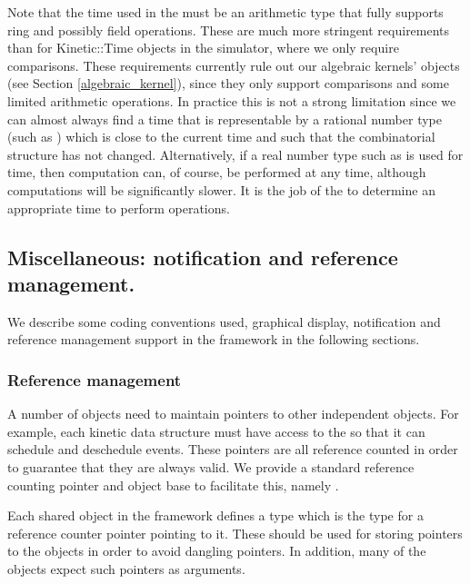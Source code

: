 Note that the time used in the  must
be an arithmetic type that fully supports ring and possibly field
operations.  These are much more stringent requirements than for
Kinetic::Time objects in the simulator, where we only require
comparisons. These requirements currently rule out our algebraic
kernels'  objects (see Section \ref{algebraic_kernel}),
since they only support comparisons and some limited arithmetic
operations. In practice this is not a strong limitation since we can
almost always find a time that is representable by a rational number
type (such as ) which is close to the current time and such
that the combinatorial structure has not changed. Alternatively, if a
real number type such as  is used for time, then
computation can, of course, be performed at any time, although
computations will be significantly slower.  It is the job of the
 to determine an appropriate time to perform
operations.


\subsection{Miscellaneous: notification and reference management.}
\label{sec:misc}

We describe some coding conventions used, graphical display,
notification and reference management support in the framework in the
following sections.


\subsubsection{Reference management}

A number of objects need to maintain pointers to other independent
objects. For example, each kinetic data structure must have access to
the  so that it can schedule and deschedule
events. These pointers are all reference counted in order to guarantee
that they are always valid. We provide a standard reference counting
pointer and object base to facilitate this, namely
.

Each shared object in the framework defines a type  which is the
type for a reference counter pointer pointing to it. These should be
used for storing pointers to the objects in order to avoid dangling
pointers. In addition, many of the objects expect such pointers as
arguments.

